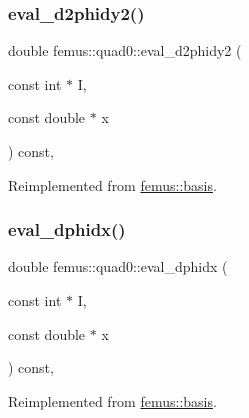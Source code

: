 \mbox{\label{classfemus_1_1quad0_a8dc516b64dc264896404b1d40019103a}} 
\subsubsection{\texorpdfstring{eval\+\_\+d2phidy2()}{eval\_d2phidy2()}}
{\footnotesize\ttfamily double femus\+::quad0\+::eval\+\_\+d2phidy2 (\begin{DoxyParamCaption}\item[{const int $\ast$}]{I,  }\item[{const double $\ast$}]{x }\end{DoxyParamCaption}) const\hspace{0.3cm}{\ttfamily [inline]}, {\ttfamily [virtual]}}



Reimplemented from \mbox{\hyperlink{classfemus_1_1basis_a0febb29fe4b32213ff8d6d428f7241cd}{femus\+::basis}}.

\mbox{\label{classfemus_1_1quad0_a133c55e14eebed1f15970ce98f3823b6}} 
\subsubsection{\texorpdfstring{eval\+\_\+dphidx()}{eval\_dphidx()}}
{\footnotesize\ttfamily double femus\+::quad0\+::eval\+\_\+dphidx (\begin{DoxyParamCaption}\item[{const int $\ast$}]{I,  }\item[{const double $\ast$}]{x }\end{DoxyParamCaption}) const\hspace{0.3cm}{\ttfamily [inline]}, {\ttfamily [virtual]}}



Reimplemented from \mbox{\hyperlink{classfemus_1_1basis_a4db7d29cf8a753ddbccc4a297dafa0bf}{femus\+::basis}}.

\mbox{\label{classfemus_1_1quad0_a94e861fcc24e2013fac6bdc1a07a88d8}} 
